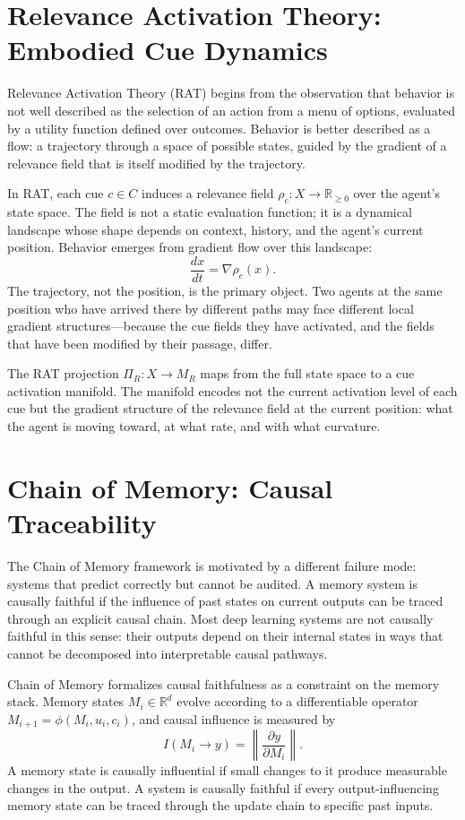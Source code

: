 \documentclass[12pt, oneside]{book}
\theoremstyle{flyxion}
\theoremstyle{definition}
\begin{document}
\section{Relevance Activation Theory: Embodied Cue Dynamics}

Relevance Activation Theory (RAT) begins from the observation that
behavior is not well described as the selection of an action from a
menu of options, evaluated by a utility function defined over outcomes.
Behavior is better described as a flow: a trajectory through a space
of possible states, guided by the gradient of a relevance field that
is itself modified by the trajectory.

In RAT, each cue $c \in C$ induces a relevance field $\rho_c : X \to
\mathbb{R}_{\geq 0}$ over the agent's state space. The field is not a
static evaluation function; it is a dynamical landscape whose shape
depends on context, history, and the agent's current position. Behavior
emerges from gradient flow over this landscape:
\[
\frac{dx}{dt} = \nabla \rho_c(x).
\]
The trajectory, not the position, is the primary object. Two agents at
the same position who have arrived there by different paths may face
different local gradient structures---because the cue fields they have
activated, and the fields that have been modified by their passage,
differ.

The RAT projection $\Pi_R : X \to M_R$ maps from the full state space
to a cue activation manifold. The manifold encodes not the current
activation level of each cue but the gradient structure of the
relevance field at the current position: what the agent is moving
toward, at what rate, and with what curvature.

\section{Chain of Memory: Causal Traceability}

The Chain of Memory framework is motivated by a different failure mode:
systems that predict correctly but cannot be audited. A memory system
is causally faithful if the influence of past states on current outputs
can be traced through an explicit causal chain. Most deep learning
systems are not causally faithful in this sense: their outputs depend
on their internal states in ways that cannot be decomposed into
interpretable causal pathways.

Chain of Memory formalizes causal faithfulness as a constraint on the
memory stack. Memory states $M_i \in \mathbb{R}^d$ evolve according to
a differentiable operator $M_{i+1} = \phi(M_i, u_i, c_i)$, and causal
influence is measured by
\[
I(M_i \to y) = \left\|\frac{\partial y}{\partial M_i}\right\|.
\]
A memory state is causally influential if small changes to it produce
measurable changes in the output. A system is causally faithful if
every output-influencing memory state can be traced through the update
chain to specific past inputs.
\end{document}
